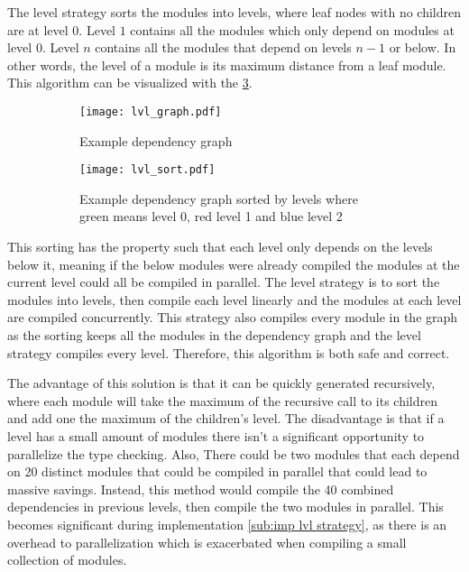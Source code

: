 The level strategy sorts the modules into levels, where leaf nodes with no
children are at level \(0\). Level \(1\) contains all the modules which only depend on
modules at level \(0\). Level \(n\) contains all the modules that depend on levels \(n
- 1\) or below. In other words, the level of a module is its maximum distance
from a leaf module. This algorithm can be visualized with the \cref{subfig: lvl strat}.
\begin{figure}[H]
  \begin{subfigure}[t]{0.45\textwidth}
    \centering
    \texttt{[image: lvl\_graph.pdf]}
    \caption{Example dependency graph}
    \label{fig:example lvl dep graph}
  \end{subfigure} \hfill
  \begin{subfigure}[t]{0.45\textwidth}
    \centering
    \texttt{[image: lvl\_sort.pdf]}
    \caption{Example dependency graph sorted by levels where green means level
    0, red level 1 and blue level 2}
    \label{fig:example lvl sort}
  \end{subfigure}
  \caption{}
  \label{subfig: lvl strat}
\end{figure}

This sorting has the property such that each level only depends on the levels
below it, meaning if the below modules were already compiled the modules at the
current level could all be compiled in parallel. The level strategy is to sort
the modules into levels, then compile each level linearly and the modules at
each level are compiled concurrently. This strategy also compiles every module
in the graph as the sorting keeps all the modules in the dependency graph and
the level strategy compiles every level. Therefore, this algorithm is both safe
and correct.


The advantage of this solution is that it can be quickly generated recursively,
where each module will take the maximum of the recursive call to its children
and add one the maximum of the children's level. The disadvantage is that if a
level has a small amount of modules there isn't a significant opportunity to
parallelize the type checking. Also, There could be two modules that each
depend  on 20 distinct modules that could be compiled in parallel that could
lead to massive savings. Instead, this method would compile the 40 combined
dependencies in previous levels, then compile the two modules in parallel. This
becomes significant during implementation \cref{sub:imp lvl strategy}, as there
is an overhead to parallelization which is exacerbated when compiling a small
collection of modules.


